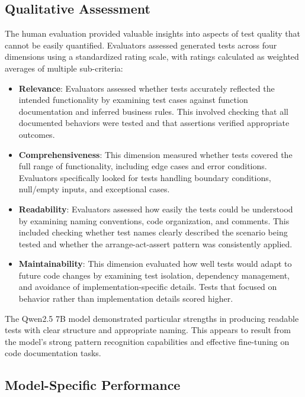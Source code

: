 \subsection{Qualitative Assessment}

The human evaluation provided valuable insights into aspects of test quality that cannot be easily quantified. Evaluators assessed generated tests across four dimensions using a standardized rating scale, with ratings calculated as weighted averages of multiple sub-criteria:

\begin{itemize}
    \item \textbf{Relevance}: Evaluators assessed whether tests accurately reflected the intended functionality by examining test cases against function documentation and inferred business rules. This involved checking that all documented behaviors were tested and that assertions verified appropriate outcomes.
    
    \item \textbf{Comprehensiveness}: This dimension measured whether tests covered the full range of functionality, including edge cases and error conditions. Evaluators specifically looked for tests handling boundary conditions, null/empty inputs, and exceptional cases.
    
    \item \textbf{Readability}: Evaluators assessed how easily the tests could be understood by examining naming conventions, code organization, and comments. This included checking whether test names clearly described the scenario being tested and whether the arrange-act-assert pattern was consistently applied.
    
    \item \textbf{Maintainability}: This dimension evaluated how well tests would adapt to future code changes by examining test isolation, dependency management, and avoidance of implementation-specific details. Tests that focused on behavior rather than implementation details scored higher.
\end{itemize}

The Qwen2.5 7B model demonstrated particular strengths in producing readable tests with clear structure and appropriate naming. This appears to result from the model's strong pattern recognition capabilities and effective fine-tuning on code documentation tasks.

\subsection{Model-Specific Performance}

